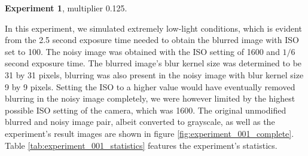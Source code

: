 \documentclass[12pt,notitlepage]{report}
\begin{document}
\noindent \textbf{Experiment 1}, multiplier 0.125.

In this experiment, we simulated extremely low-light conditions, which is evident from the 2.5 second exposure time needed to obtain the blurred image with ISO set to 100. The noisy image was obtained with the ISO setting of 1600 and $1/6$ second exposure time. The blurred image's blur kernel size was determined to be 31 by 31 pixels, blurring was also present in the noisy image with blur kernel size 9 by 9 pixels. Setting the ISO to a higher value would have eventually removed blurring in the noisy image completely, we were however limited by the highest possible ISO setting of the camera, which was 1600. The original unmodified blurred and noisy image pair, albeit converted to grayscale, as well as the experiment's result images are shown in figure \ref{fig:experiment_001_complete}. Table \ref{tab:experiment_001_statistics} features the experiment's statistics.
\end{document}
